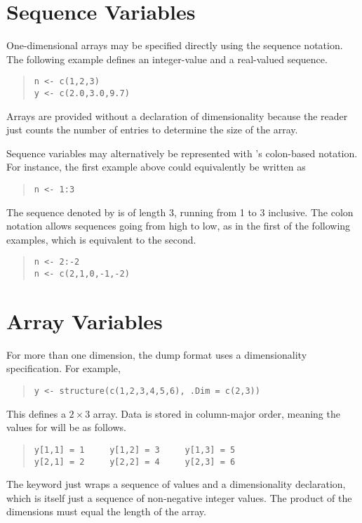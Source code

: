 \section{Sequence Variables}

One-dimensional arrays may be specified directly using the \SPLUS
sequence notation.  The following example defines an integer-value and
a real-valued sequence.
%
\begin{quote}
\begin{Verbatim}[fontsize=\small]
n <- c(1,2,3)
y <- c(2.0,3.0,9.7)
\end{Verbatim}
\end{quote}
%
Arrays are provided without a declaration of dimensionality because
the reader just counts the number of entries to determine the size of
the array.

Sequence variables may alternatively be represented with \R's
colon-based notation.  For instance, the first example above could
equivalently be written as
%
\begin{quote}
\begin{Verbatim} 
n <- 1:3
\end{Verbatim}
\end{quote}
% 
The sequence denoted by  is of length 3, running from 1 to 3
inclusive.  The colon notation allows sequences going from high to
low, as in the first of the following examples, which is equivalent to
the second.
%
\begin{quote}
\begin{Verbatim}[fontsize=\small]
n <- 2:-2
n <- c(2,1,0,-1,-2)
\end{Verbatim}
\end{quote}
%


\section{Array Variables}

For more than one dimension, the dump format uses a dimensionality
specification.  For example,
%
\begin{quote}
\begin{verbatim}
y <- structure(c(1,2,3,4,5,6), .Dim = c(2,3))
\end{verbatim}
\end{quote}
%
This defines a $2 \times 3$ array.  Data is stored in column-major
order, meaning the values for  will be as follows.
%
\begin{quote}
\begin{Verbatim}[fontsize=\small]
y[1,1] = 1     y[1,2] = 3     y[1,3] = 5    
y[2,1] = 2     y[2,2] = 4     y[2,3] = 6
\end{Verbatim}
\end{quote}
%
The  keyword just wraps a sequence of values and a
dimensionality declaration, which is itself just a sequence of
non-negative integer values.  The product of the dimensions must equal
the length of the array.

